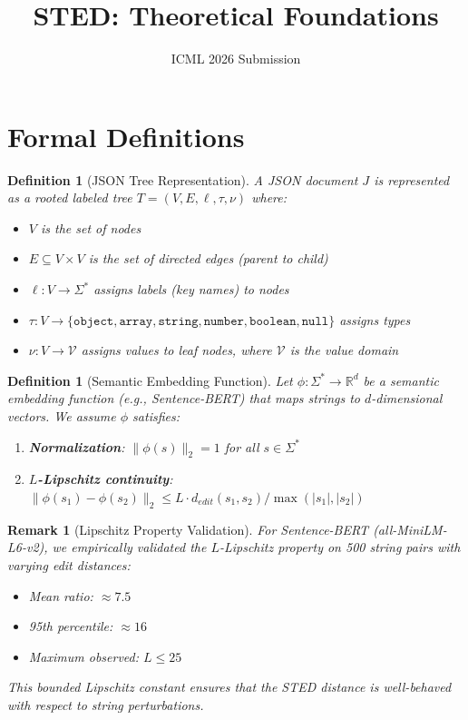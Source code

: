 \documentclass{article}
\title{STED: Theoretical Foundations}
\author{ICML 2026 Submission}
\date{}
\newtheorem{definition}[theorem]{Definition}
\newtheorem{remark}[theorem]{Remark}
\begin{document}
\maketitle

\section{Formal Definitions}

\begin{definition}[JSON Tree Representation]
\label{def:json-tree}
A JSON document $J$ is represented as a rooted labeled tree $T = (V, E, \ell, \tau, \nu)$ where:
\begin{itemize}
    \item $V$ is the set of nodes
    \item $E \subseteq V \times V$ is the set of directed edges (parent to child)
    \item $\ell: V \to \Sigma^*$ assigns labels (key names) to nodes
    \item $\tau: V \to \{\texttt{object}, \texttt{array}, \texttt{string}, \texttt{number}, \texttt{boolean}, \texttt{null}\}$ assigns types
    \item $\nu: V \to \mathcal{V}$ assigns values to leaf nodes, where $\mathcal{V}$ is the value domain
\end{itemize}
\end{definition}

\begin{definition}[Semantic Embedding Function]
\label{def:embedding}
Let $\phi: \Sigma^* \to \mathbb{R}^d$ be a semantic embedding function (e.g., Sentence-BERT) that maps strings to $d$-dimensional vectors. We assume $\phi$ satisfies:
\begin{enumerate}
    \item \textbf{Normalization}: $\|\phi(s)\|_2 = 1$ for all $s \in \Sigma^*$
    \item \textbf{$L$-Lipschitz continuity}: $\|\phi(s_1) - \phi(s_2)\|_2 \leq L \cdot d_{edit}(s_1, s_2) / \max(|s_1|, |s_2|)$
\end{enumerate}
\end{definition}

\begin{remark}[Lipschitz Property Validation]
For Sentence-BERT (all-MiniLM-L6-v2), we empirically validated the $L$-Lipschitz property on 500 string pairs with varying edit distances:
\begin{itemize}
    \item Mean ratio: $\approx 7.5$
    \item 95th percentile: $\approx 16$
    \item Maximum observed: $L \leq 25$
\end{itemize}
This bounded Lipschitz constant ensures that the STED distance is well-behaved with respect to string perturbations.
\end{remark}
\end{document}
